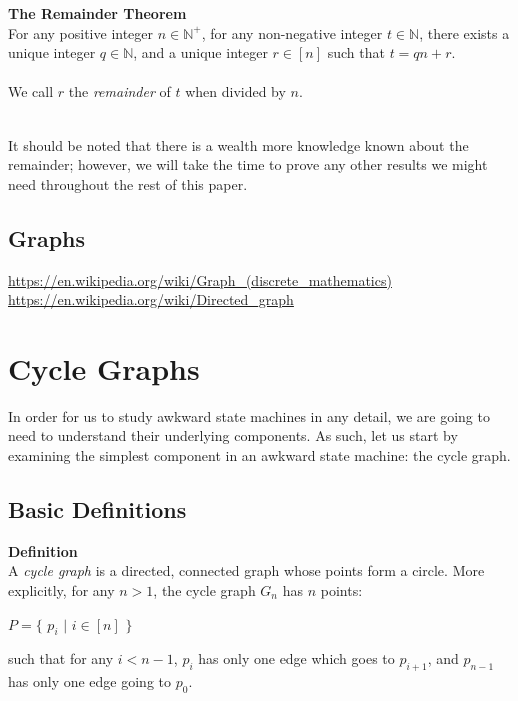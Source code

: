 \documentclass[a4paper,12pt]{article}
\begin{document}
\begin{tcolorbox}
\textbf{\hypertarget{theorem:remainder}{The Remainder Theorem}}\\
For any positive integer $n \in \mathbb{N^{+}}$, for any non-negative integer $t \in \mathbb{N}$, there exists a unique integer $q \in \mathbb{N}$, and a unique integer $r \in [n]$ such that $t = qn + r$.\\
\\
We call $r$ the \textit{remainder} of $t$ when divided by $n$.
\end{tcolorbox}
\label{theorem:remainder}
\hypertarget{theorem:remainder}{}
\noindent
\\
It should be noted that there is a wealth more knowledge known about the remainder; however, we will take the time to prove any other results we might need throughout the rest of this paper.


\subsection{Graphs}
\url{https://en.wikipedia.org/wiki/Graph_(discrete_mathematics)}\\
\url{https://en.wikipedia.org/wiki/Directed_graph}

\section{Cycle Graphs}
\label{sec:cycle_graphs}


In order for us to study awkward state machines in any detail, we are going to need to understand their underlying components. As such, let us start by examining the simplest component in an awkward state machine: the cycle graph.



\subsection{Basic Definitions}
\label{sec:cycle_graphs_basic_definitions}

\label{definition:cycle_graph}
\hypertarget{definition:cycle_graph}{}
\begin{tcolorbox}
\textbf{Definition}\\
A \textit{cycle graph} is a directed, connected graph whose points form a circle. More explicitly, for any $n > 1$, the cycle graph $G_n$ has $n$ points:

\begin{center}
$P = \{$ $p_i$ $|$ $i \in [n]$ $\}$
\end{center}
\noindent

such that for any $i < n - 1$, $p_i$ has only one edge which goes to $p_{i + 1}$, and $p_{n-1}$ has only one edge going to $p_0$.
\end{tcolorbox}
\end{document}

